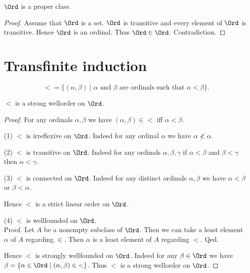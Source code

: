 \documentclass[../../set-theory/set-theory.tex]{subfiles}
\begin{document}
  \begin{forthel}
    \begin{theorem}
      $\Ord$ is a proper class.
    \end{theorem}
    \begin{proof}
      Assume that $\Ord$ is a set.
      $\Ord$ is transitive and every element of $\Ord$ is transitive.
      Hence $\Ord$ is an ordinal.
      Thus $\Ord \in \Ord$.
      Contradiction.
    \end{proof}
  \end{forthel}


  \section{Transfinite induction}

  \begin{forthel}
    \begin{definition}
      \[ {<} = \{ (\alpha, \beta) \mid \text{$\alpha$ and $\beta$ are ordinals
      such that $\alpha < \beta$} \}. \]
    \end{definition}
  \end{forthel}

  \begin{forthel}
    \begin{proposition}
      ${<}$ is a strong wellorder on $\Ord$.
    \end{proposition}
    \begin{proof}
      For any ordinals $\alpha, \beta$ we have $(\alpha,\beta) \in {<}$ iff
      $\alpha < \beta$.

      (1) ${<}$ is irreflexive on $\Ord$.
      Indeed for any ordinal $\alpha$ we have $\alpha \nless \alpha$.

      (2) ${<}$ is transitive on $\Ord$.
      Indeed for any ordinals $\alpha, \beta, \gamma$ if $\alpha < \beta$ and
      $\beta < \gamma$ then $\alpha < \gamma$.

      (3) ${<}$ is connected on $\Ord$.
      Indeed for any distinct ordinals $\alpha, \beta$ we have $\alpha < \beta$
      or $\beta < \alpha$.

      Hence ${<}$ is a strict linear order on $\Ord$.

      (4) ${<}$ is wellfounded on $\Ord$. \\
      Proof.
        Let $A$ be a nonempty subclass of $\Ord$.
        Then we can take a least element $\alpha$ of $A$ regarding ${\in}$.
        Then $\alpha$ is a least element of $A$ regarding ${<}$.
      Qed.

      Hence ${<}$ is strongly wellfounded on $\Ord$.
      Indeed for any $\beta \in \Ord$ we have $\beta = \{ \alpha \in \Ord \mid
      (\alpha,\beta) \in {<} \}$.
      Thus ${<}$ is a strong wellorder on $\Ord$.
    \end{proof}
  \end{forthel}
\end{document}
